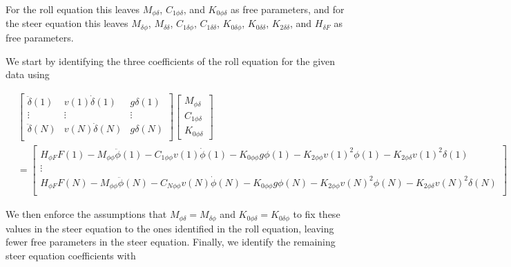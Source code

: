 \documentclass[a4paper]{article}
\begin{document}
For the roll equation this leaves $M_{\phi\delta}$, $C_{1\phi\delta}$,
and $K_{0\phi\delta}$ as free parameters, and for the steer equation
this leaves $M_{\delta\phi}$, $M_{\delta\delta}$, $C_{1\delta\phi}$,
$C_{1\delta\delta}$, $K_{0\delta\phi}$, $K_{0\delta\delta}$,
$K_{2\delta\delta}$, and $H_{\delta F}$ as free parameters.

We start by identifying the three coefficients of the roll equation for
the given data using

\begin{align}
  &\begin{bmatrix}
     \ddot{\delta}(1) &
     v(1) \dot{\delta}(1) &
     g \delta(1) \\
     \vdots & \vdots & \vdots\\
     \ddot{\delta}(N) &
     v(N) \dot{\delta}(N) &
     g \delta(N) \\
  \end{bmatrix}
  \begin{bmatrix}
    M_{\phi\delta} \\
    C_{1\phi\delta} \\
    K_{0\phi\delta}
  \end{bmatrix}\\
  &=
  \begin{bmatrix}
    H_{\phi F} F(1)
    - M_{\phi\phi} \ddot{\phi}(1)
    - C_{1\phi\phi} v(1) \dot{\phi}(1)
    - K_{0\phi\phi} g \phi(1)
    - K_{2\phi\phi} v(1)^2 \phi(1)
    - K_{2\phi\delta} v(1)^2 \delta(1) \\
  \vdots\\
    H_{\phi F} F(N)
    - M_{\phi\phi} \ddot{\phi}(N)
    - C_{N\phi\phi} v(N) \dot{\phi}(N)
    - K_{0\phi\phi} g \phi(N)
    - K_{2\phi\phi} v(N)^2 \phi(N)
    - K_{2\phi\delta} v(N)^2 \delta(N) \\
  \end{bmatrix} \nonumber
\end{align}

We then enforce the assumptions that $M_{\phi\delta} = M_{\delta\phi}$ and
$K_{0\phi\delta} = K_{0\delta\phi}$ to fix these values in the steer equation
to the ones identified in the roll equation, leaving fewer free parameters in
the steer equation. Finally, we identify the remaining steer equation
coefficients with
\end{document}
